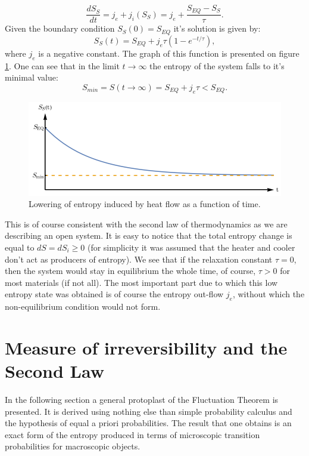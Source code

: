 \documentclass[a4paper,12pt]{article}
\begin{document}
\begin{equation}
\frac{dS_S}{dt}=j_e + j_i\left(S_S\right)=j_e +\frac{S_{EQ}-S_S}{\tau}.
\label{dSSdt}
\end{equation} 
Given the boundary condition $S_S(0) =S_{EQ}$ it's solution is given by:
\begin{equation}
S_S(t)=S_{EQ}+j_e\tau \left(1-e^{-t/\tau }\right),
\end{equation} 
where $j_e$ is a negative constant. The graph of this function is presented on figure \ref{Fig3}. 
One can see that in the limit $t\rightarrow \infty$ the entropy of the system falls to it's minimal value:
\begin{equation}
S_{min}=S(t\rightarrow \infty) =S_{EQ}+j_e \tau < S_{EQ}.
\end{equation}

\begin{figure}[ht!]
\centering \includegraphics[width=12cm]{wykres3} 
\caption{Lowering of entropy induced by heat flow as a function of time.}
\label{Fig3} 
\end{figure}

This is of course consistent with the second law of thermodynamics as we are describing an open system.
It is easy to notice that the total entropy change is equal to $dS=dS_i \geq 0$ (for simplicity it was assumed that the heater and cooler don't act as producers of entropy).
We see that if the relaxation constant $\tau = 0$, then the system would stay in equilibrium the whole time, of course, $\tau > 0$ for most materials (if not all). The most important part due to which this low entropy state was obtained is of course the entropy out-flow $j_e$, without which the non-equilibrium condition would not form.

\section{Measure of irreversibility and the Second Law}
\label{IrreversibilityMeasureSection}
In the following section a general protoplast of the Fluctuation Theorem is presented. It is derived using nothing else than simple probability calculus and the hypothesis of equal a priori probabilities.
The result that one obtains is an exact form of the entropy produced in terms of microscopic transition probabilities for macroscopic objects.
\end{document}

